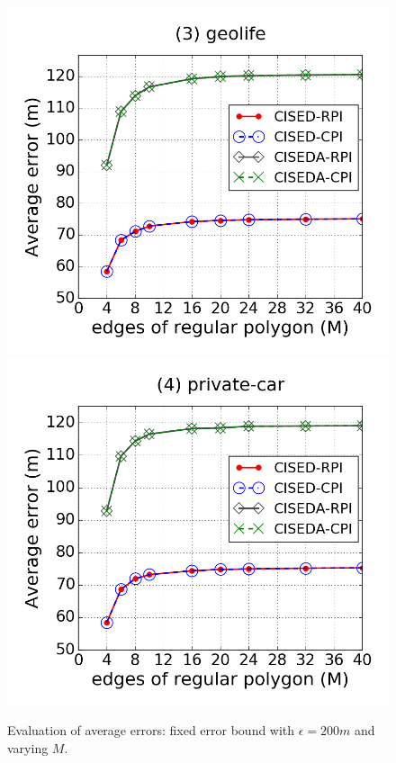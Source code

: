 \begin{figure}[tb!]
\includegraphics[scale = 0.250]{figures/Exp-M-e-200-error-geolife.png}
\includegraphics[scale = 0.250]{figures/Exp-M-e-200-error-private.png}
\vspace{-2ex}
\caption{\small Evaluation of average errors: fixed error bound with $\epsilon = 200m$ and varying $M$.}
\label{fig:m-error-e200}
\vspace{-1ex}
\end{figure}




